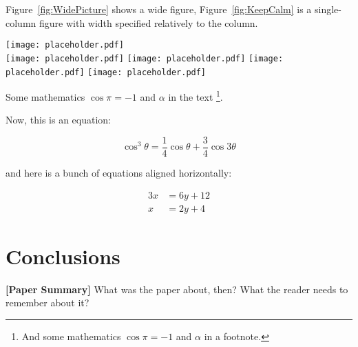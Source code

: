 \documentclass{ExcelAtFIT}
\begin{document}
Figure~\ref{fig:WidePicture} shows a wide figure, Figure~\ref{fig:KeepCalm} is a single-column figure with width specified relatively to the column.
\begin{figure*}[t]\centering %
  \centering
  \texttt{[image: placeholder.pdf]}\\[1pt]
  \texttt{[image: placeholder.pdf]}
  \texttt{[image: placeholder.pdf]}
  \texttt{[image: placeholder.pdf]}
  \texttt{[image: placeholder.pdf]}
  \caption{Wide Picture.  The whole figure can be composed of several smaller images.  If you want to address individual images in the caption or from the text, use the \textit{subcaption} package.}
  \label{fig:WidePicture}
\end{figure*}
Some mathematics $\cos\pi=-1$ and $\alpha$ in the text%
\footnote{And some mathematics $\cos\pi=-1$ and $\alpha$ in a footnote.}.

Now, this is an equation:
\begin{linenomath}
\begin{equation}
\cos^3 \theta =\frac{1}{4}\cos\theta+\frac{3}{4}\cos 3\theta
\label{eq:refname2}
\end{equation}
\end{linenomath}
and here is a bunch of equations aligned horizontally:
\begin{linenomath}
\begin{align}
	3x &= 6y + 12 \\
	x &= 2y + 4
\end{align}
\end{linenomath}



\section{Conclusions}
\label{sec:Conclusions}

\textbf{[Paper Summary]} What was the paper about, then? What the reader needs to remember about it?
\end{document}
